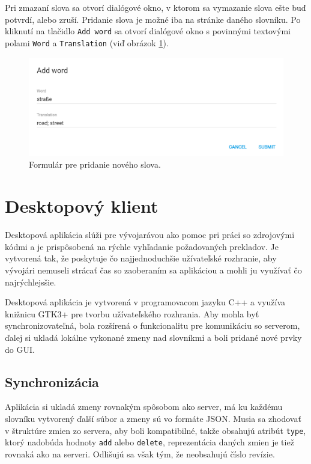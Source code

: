 \documentclass[
  digital, %
  table,   %
  lof,     %
  lot,     %
]{fithesis3}
\begin{document}
Pri zmazaní slova sa otvorí dialógové okno, v ktorom sa vymazanie slova ešte buď potvrdí, alebo zruší. Pridanie slova je možné iba na stránke daného slovníku. Po kliknutí na tlačidlo \texttt{Add word} sa otvorí dialógové okno s povinnými textovými polami \texttt{Word} a \texttt{Translation} (viď obrázok \ref{fig:addword-form}).

\begin{figure}
	\begin{center}
	\includegraphics[width=1.0\textwidth]{img/addword-form.png}
	\end{center}
    \caption{Formulár pre pridanie nového slova.}
	\label{fig:addword-form}
\end{figure}


\chapter{Desktopový klient}
Desktopová aplikácia slúži pre vývojarávou ako pomoc pri práci so zdrojovými kódmi a je prispôsobená na rýchle vyhľadanie požadovaných prekladov. Je vytvorená tak, že poskytuje čo najjednoduchšie užívateľské rozhranie, aby vývojári nemuseli strácať čas so zaoberaním sa aplikáciou a mohli ju využívať čo najrýchlejsšie.

Desktopová aplikácia je vytvorená v programovacom jazyku C++ a využíva knižnicu GTK3+ pre tvorbu užívateľského rozhrania. Aby mohla byť synchronizovateľná, bola rozšírená o funkcionalitu pre komunikáciu so serverom, ďalej si ukladá lokálne vykonané zmeny nad slovníkmi a boli pridané nové prvky do GUI.

\section{Synchronizácia}
Aplikácia si ukladá zmeny rovnakým spôsobom ako server, má ku každému slovníku vytvorený ďalší súbor a zmeny sú vo formáte JSON. Musia sa zhodovať v štruktúre zmien zo servera, aby boli kompatibilné, takže obsahujú atribút \texttt{type}, ktorý nadobúda hodnoty \texttt{add} alebo \texttt{delete}, reprezentácia daných zmien je tiež rovnaká ako na serveri. Odlišujú sa však tým, že neobsahujú číslo revízie.
\end{document}
